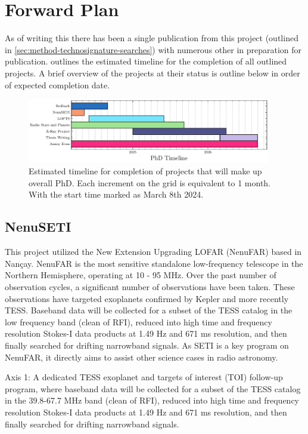 \newpage 
\section{Forward Plan}

As of writing this there has been a single publication from this project (outlined in \cref{sec:method-technosignature-searches}) with numerous other in preparation for publication.  outlines the estimated timeline for the completion of all outlined projects. A brief overview of the projects at their status is outline below in order of expected completion date. 

\begin{figure}[h]
    \centering
    \includegraphics[width=0.95\textwidth]{figs/PhD_gannt_chart.pdf}
    \caption{Estimated timeline for completion of projects that will make up overall PhD. Each increment on the grid is equivalent to 1 month. With the start time marked as March 8th 2024.}
    \label{fig:gannt_chart}
\end{figure}

\subsection{NenuSETI}
This project utilized the New Extension Upgrading LOFAR (NenuFAR) based in Nançay. NenuFAR is the most sensitive standalone low-frequency telescope in the Northern Hemisphere, operating at 10 - 95 MHz. Over the past number of observation cycles, a significant number of observations have been taken. These observations have targeted exoplanets confirmed by Kepler and more recently TESS. Baseband data will be collected for a subset of the TESS catalog in the low frequency band (clean of RFI), reduced into high time and frequency resolution Stokes-I data products at 1.49 Hz and 671 ms resolution, and then finally searched for drifting narrowband signals. As SETI is a key program on NenuFAR, it directly aims to assist other science cases in radio astronomy. \ 

Axis 1: A dedicated TESS exoplanet and targets of interest (TOI) follow-up program, where baseband data will be collected for a subset of the TESS catalog in the 39.8-67.7 MHz band (clean of RFI), reduced into high time and frequency resolution Stokes-I data products at 1.49 Hz and 671 ms resolution, and then finally searched for drifting narrowband signals.

